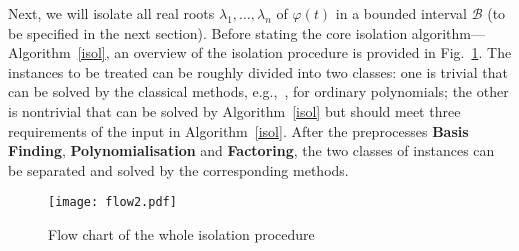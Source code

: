 \documentclass[a4paper,UKenglish,cleveref,autoref,thm-restate,authorcolumns]{lipics-v2019}
\begin{document}
Next, we will isolate all real roots $\lambda_1,\ldots,\lambda_n$ of $\varphi(t)$
in a bounded interval $\mathcal{B}$ (to be specified in the next section).
Before stating the core isolation algorithm---Algorithm~\ref{isol},
an overview of the isolation procedure is provided in Fig.~\ref{flow}.
The instances to be treated can be roughly divided into two classes: 
one is trivial that can be solved by the classical methods, e.g.,~\cite{CoL76},
for ordinary polynomials; 
the other is nontrivial that can be solved by Algorithm~\ref{isol}
but should meet three requirements of the input in Algorithm~\ref{isol}.
After the preprocesses \textbf{Basis Finding}, \textbf{Polynomialisation} and \textbf{Factoring},
the two classes of instances can be separated and solved by the corresponding methods.

\begin{figure}
	\texttt{[image: flow2.pdf]}
	\caption{Flow chart of the whole isolation procedure}
	\label{flow}
\end{figure}
\end{document}
